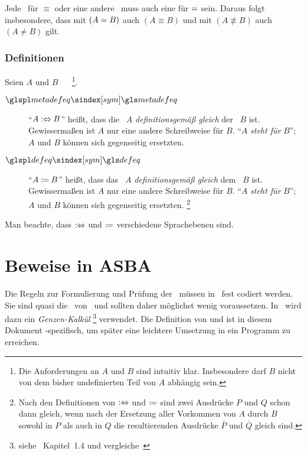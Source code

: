 Jede \interessierendeEigenschaft\ für $\equiv$ oder eine andere \Aequivalenz\ muss auch eine für $=$ sein.
Daraus folgt insbesondere, dass mit $(A = B)$ auch $(A \equiv B)$ und mit $(A \nequiv B)$ auch $(A \ne B)$ gilt.

\subsubsection{Definitionen}%
\label{subsub:Definitionen}

Seien $A$ und $B$ \Aussagen\ \textbzw\ \Objekte%
\footnote{%
	Die Anforderungen an $A$ und $B$ sind intuitiv klar.
	Insbesondere darf $B$ nicht von dem bisher undefinierten Teil von $A$ abhängig sein.
}.
\begin{description}
	\item[$\glsSym{metadefeq}$]  \label{def:Metadefinition}
	\enquote{$A :\Leftrightarrow B$} heißt, dass die \Aussage\ $A$ \emph{definitionsgemäß gleich} der \Aussage\ $B$ ist.
	Gewissermaßen ist $A$ nur eine andere Schreibweise für $B$.
	\enquote{$A$ \emph{steht für} $B$}; $A$ und $B$ können sich gegenseitig ersetzten.
	\item[$\glsSym{defeq}$]  \label{def:Definition}
	\enquote{$A \coloneqq B$} heißt, dass das \Objekt\ $A$ \emph{definitionsgemäß gleich} dem \Objekt\ $B$ ist.
	Gewissermaßen ist $A$ nur eine andere Schreibweise für $B$.
	\enquote{$A$ \emph{steht für} $B$}; $A$ und $B$ können sich gegenseitig ersetzten.%
	\footnote{%
		Nach den Definitionen von $:\Leftrightarrow$ und $\coloneqq$ sind zwei Ausdrücke $P$ und $Q$ schon dann gleich, wenn nach der Ersetzung aller Vorkommen von $A$ durch $B$ sowohl in $P$ als auch in $Q$ die resultierenden Ausdrücke $\overline{P}$ und $\overline{Q}$ gleich sind.
	}
\end{description}
Man beachte, dass $:\Leftrightarrow$ und $\coloneqq$ verschiedene Sprachebenen sind.

\section{Beweise in ASBA}%
\label{sec:BeweiseASBA}

Die Regeln zur Formulierung und Prüfung der \Beweise\ müssen in \ASBA\ fest codiert werden.
Sie sind quasi die \Axiome\ von \ASBA\ und sollten daher möglichst wenig voraussetzen.
In \ASBA\ wird dazu ein \emph{Genzen-Kalkül}%
\footnote{%
	siehe~\cite{bib:Rautenberg} Kapitel~1.4 und vergleiche~\cite{bib:Schlussregel,bib:NatuerlichesSchliessen}
} verwendet.
Die Definition von \emph{\Schlussregel} und \emph{\Beweis} ist in diesem Dokument \ASBA-spezifisch, um später eine leichtere Umsetzung in ein Programm zu erreichen.


